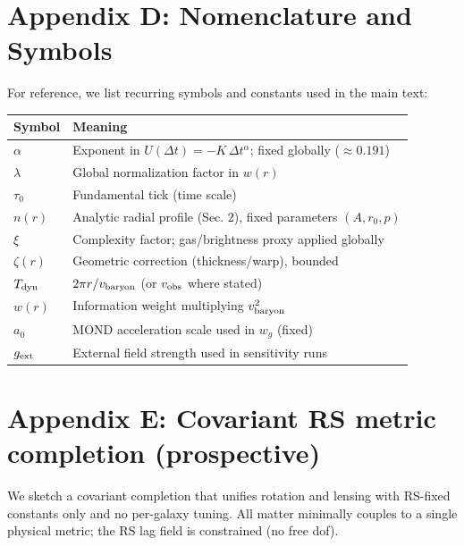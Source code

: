 \documentclass[fleqn,usenatbib]{mnras}
\begin{document}
\section*{Appendix D: Nomenclature and Symbols}
\noindent For reference, we list recurring symbols and constants used in the main text:
\begin{center}
\begin{tabular}{ll}
\toprule
Symbol & Meaning \\
\midrule
$\alpha$ & Exponent in $U(\Delta t)=-K\,\Delta t^{\alpha}$; fixed globally ($\approx0.191$) \\
$\lambda$ & Global normalization factor in $w(r)$ \\
$\tau_0$ & Fundamental tick (time scale) \\
$n(r)$ & Analytic radial profile (Sec. 2), fixed parameters $(A,r_0,p)$ \\
$\xi$ & Complexity factor; gas/brightness proxy applied globally \\
$\zeta(r)$ & Geometric correction (thickness/warp), bounded \\
$T_{\rm dyn}$ & $2\pi r/v_{\rm baryon}$ (or $v_{\rm obs}$ where stated) \\
$w(r)$ & Information weight multiplying $v_{\rm baryon}^2$ \\
$a_0$ & MOND acceleration scale used in $w_g$ (fixed) \\
$g_{\rm ext}$ & External field strength used in sensitivity runs \\
\bottomrule
\end{tabular}
\end{center}

\section*{Appendix E: Covariant RS metric completion (prospective)}
\noindent We sketch a covariant completion that unifies rotation and lensing with RS-fixed constants only and no per-galaxy tuning. All matter minimally couples to a single physical metric; the RS lag field is constrained (no free dof).
\end{document}
